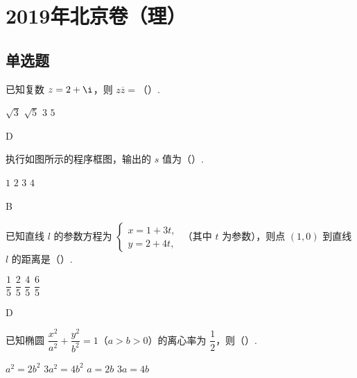 \chapter{2019年北京卷（理）}

\section{单选题}

\begin{problem}
已知复数 \(z=2+\i\)，则 \(z\overline z=\)（\quad）.

\choices
    {\(\sqrt3\)}
    {\(\sqrt5\)}
    {\(3\)}
    {\(5\)}
\end{problem}

\begin{answer}
D
\end{answer}



\begin{problem}
执行如图所示的程序框图，输出的 \(s\) 值为（\quad）.

\begin{center}
\end{center}

\choices
    {\(1\)}
    {\(2\)}
    {\(3\)}
    {\(4\)}
\end{problem}

\begin{answer}
B
\end{answer}



\begin{problem}
已知直线 \(l\) 的参数方程为
\(\begin{cases}
x=1+3t,\\
y=2+4t,
\end{cases}\)
（其中 \(t\) 为参数），则点 \((1,0)\) 到直线 \(l\) 的距离是（\quad）.

\choices
    {\(\dfrac15\)}
    {\(\dfrac25\)}
    {\(\dfrac45\)}
    {\(\dfrac65\)}
\end{problem}

\begin{answer}
D
\end{answer}



\begin{problem}
已知椭圆 \(\dfrac{x^2}{a^2}+\dfrac{y^2}{b^2}=1\)（\(a>b>0\)）的离心率为 \(\dfrac12\)，则（\quad）.

\choices
    {\(a^2=2b^2\)}
    {\(3a^2=4b^2\)}
    {\(a=2b\)}
    {\(3a=4b\)}
\end{problem}

